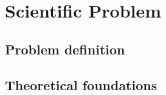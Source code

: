 \chapter{Scientific Problem}
\label{section:scientificProblem}


\section{Problem definition}
\label{section:problemDefinition}

\section{Theoretical foundations}
\label{section:theoreticalFoundations}

\cite{patternsOfEnterpriseApplicationArchitecture}
\cite{buildingRESTfulWebServicesWithSpring}
\cite{tamingTheStateInReact}
\cite{cleanArchitecture}
\cite{highPerformanceMySQL}
\cite{modernEnterpriseUiDesign}
